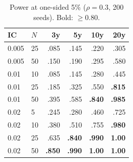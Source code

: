\documentclass[11pt]{article}
\begin{document}
\begin{table}[h]\centering\small
\caption{Power at one-sided 5\% ($\rho=0.3$, 200 seeds). Bold: $\ge 0.80$.}\label{tab:power}
\begin{tabular}{ll rrrr}\toprule
IC & $N$ & 3y & 5y & 10y & 20y\\\midrule
0.005 & 25 & .085 & .145 & .220 & .305\\
0.005 & 50 & .150 & .190 & .295 & .580\\
0.01 & 10 & .085 & .145 & .280 & .445\\
0.01 & 25 & .185 & .325 & .550 & \textbf{.815}\\
0.01 & 50 & .395 & .585 & \textbf{.840} & \textbf{.985}\\
0.02 & 5 & .245 & .280 & .460 & .725\\
0.02 & 10 & .380 & .510 & .755 & \textbf{.980}\\
0.02 & 25 & .635 & \textbf{.840} & \textbf{.990} & \textbf{1.00}\\
0.02 & 50 & \textbf{.850} & \textbf{.990} & \textbf{1.00} & \textbf{1.00}\\\bottomrule
\end{tabular}\end{table}
\end{document}
